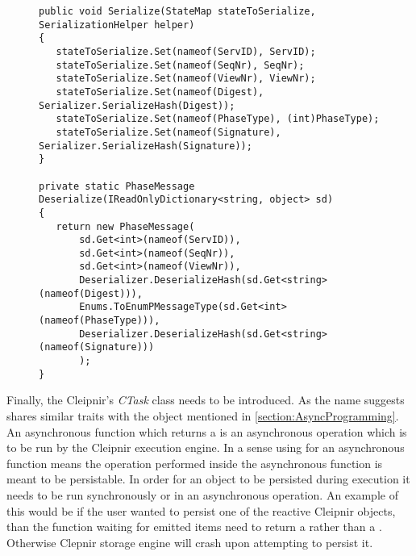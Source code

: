 \begin{figure}[H]
	\centering
	\begin{lstlisting}[label = code:seriadeseria, caption=Serialize/Deserialize code example, captionpos=b, basicstyle=\scriptsize]
public void Serialize(StateMap stateToSerialize, SerializationHelper helper)
{
   stateToSerialize.Set(nameof(ServID), ServID);
   stateToSerialize.Set(nameof(SeqNr), SeqNr);
   stateToSerialize.Set(nameof(ViewNr), ViewNr);
   stateToSerialize.Set(nameof(Digest), Serializer.SerializeHash(Digest));
   stateToSerialize.Set(nameof(PhaseType), (int)PhaseType);
   stateToSerialize.Set(nameof(Signature), Serializer.SerializeHash(Signature));
}

private static PhaseMessage Deserialize(IReadOnlyDictionary<string, object> sd)
{
   return new PhaseMessage(
       sd.Get<int>(nameof(ServID)),
       sd.Get<int>(nameof(SeqNr)),
       sd.Get<int>(nameof(ViewNr)),
       Deserializer.DeserializeHash(sd.Get<string>(nameof(Digest))),
       Enums.ToEnumPMessageType(sd.Get<int>(nameof(PhaseType))),
       Deserializer.DeserializeHash(sd.Get<string>(nameof(Signature)))
       );
}
	\end{lstlisting}
\end{figure}
Finally, the Cleipnir’s \emph{CTask} class needs to be introduced. As the name suggests  shares similar traits with the  object mentioned in \autoref{section:AsyncProgramming}. An asynchronous function which returns a  is an asynchronous operation which is to be run by the Cleipnir execution engine. In a sense using  for an asynchronous function means the operation performed inside the asynchronous function is meant to be persistable. In order for an object to be persisted during execution it needs to be run synchronously or in an asynchronous  operation. An example of this would be if the user wanted to persist one of the reactive Cleipnir  objects, than the function waiting for emitted items need to return a  rather than a . Otherwise Clepnir storage engine will crash upon attempting to persist it.


